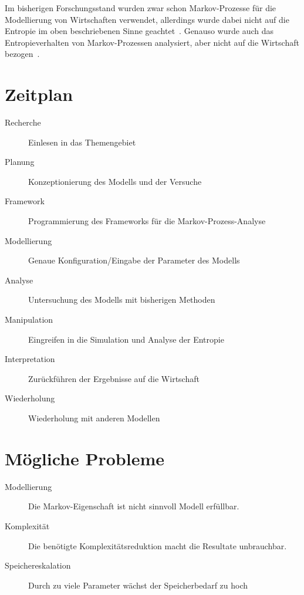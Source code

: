 \documentclass[12pt]{article}
\begin{document}
    Im bisherigen Forschungsstand wurden zwar schon Markov-Prozesse für die Modellierung
    von Wirtschaften verwendet, allerdings wurde dabei nicht auf die Entropie im oben
    beschriebenen Sinne geachtet~\cite{barde2020macroeconomic,Kostoska2020absorbingmc}.
    Genauso wurde auch das Entropieverhalten von Markov-Prozessen analysiert, aber nicht
    auf die Wirtschaft bezogen~\cite{Rahman2022mccharacteristics}.

    \newpage
    \section*{Zeitplan}
    \begin{description}
        \item[Recherche] Einlesen in das Themengebiet
        \item[Planung] Konzeptionierung des Modells und der Versuche
        \item[Framework] Programmierung des Frameworks für die Markov-Prozess-Analyse
        \item[Modellierung] Genaue Konfiguration/Eingabe der Parameter des Modells
        \item[Analyse] Untersuchung des Modells mit bisherigen Methoden
        \item[Manipulation] Eingreifen in die Simulation und Analyse der Entropie
        \item[Interpretation] Zurückführen der Ergebnisse auf die Wirtschaft
        \item[Wiederholung] Wiederholung mit anderen Modellen
    \end{description}

    \section*{Mögliche Probleme}
    \begin{description}
        \item[Modellierung] Die Markov-Eigenschaft ist nicht sinnvoll Modell erfüllbar.
        \item[Komplexität] Die benötigte Komplexitätsreduktion macht die Resultate
        unbrauchbar.
        \item[Speichereskalation] Durch zu viele Parameter wächst der Speicherbedarf zu
        hoch
    \end{description}
    
    
\end{document}
